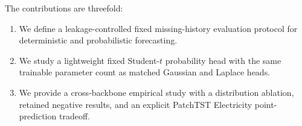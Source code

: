 The contributions are threefold:
\begin{enumerate}
    \item We define a leakage-controlled fixed missing-history evaluation protocol for deterministic and probabilistic forecasting.
    \item We study a lightweight fixed Student-$t$ probability head with the same trainable parameter count as matched Gaussian and Laplace heads.
    \item We provide a cross-backbone empirical study with a distribution ablation, retained negative results, and an explicit PatchTST Electricity point-prediction tradeoff.
\end{enumerate}
